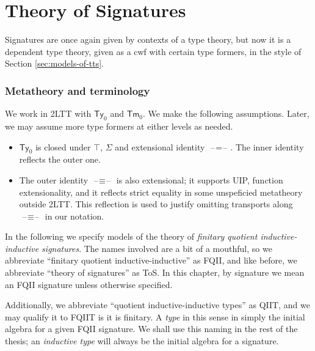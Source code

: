 \documentclass[12pt,a4paper,twoside,openany]{book}
\theoremstyle{remark}
\theoremstyle{definition}
\theoremstyle{theorem}
\newcommand{\Tm}{\mathsf{Tm}}
\newcommand{\Ty}{\mathsf{Ty}}
\newcommand{\blank}{\mathord{\hspace{1pt}\text{--}\hspace{1pt}}}
\begin{document}
\section{Theory of Signatures}
\label{sec:fqiit-tos}

Signatures are once again given by contexts of a type theory, but now it is a
dependent type theory, given as a cwf with certain type formers, in the style
of Section \ref{sec:models-of-tts}.

\subsubsection{Metatheory and terminology}
We work in 2LTT with $\Ty_0$ and $\Tm_0$. We
make the following assumptions. Later, we may assume more type formers at either
levels as needed.
\begin{itemize}
  \item $\Ty_0$ is closed under $\top$, $\Sigma$ and extensional identity $\blank\!=\!\blank$.
        The inner identity reflects the outer one.
  \item The outer identity $\blank\!\equiv\!\blank$ is also extensional; it supports
        UIP, function extensionality, and it reflects strict equality in some
        unspeficied metatheory outside 2LTT. This reflection is used to justify
        omitting transports along $\blank\!\equiv\!\blank$ in our notation.
\end{itemize}

In the following we specify models of the theory of \emph{finitary quotient
inductive-inductive signatures}. The names involved are a bit of a mouthful, so
we abbreviate ``finitary quotient inductive-inductive'' as FQII, and like
before, we abbreviate ``theory of signatures'' as ToS. In this chapter, by
signature we mean an FQII signature unless otherwise specified.

Additionally, we abbreviate ``quotient inductive-inductive types'' as QIIT, and
we may qualify it to FQIIT is it is finitary. A \emph{type} in this sense in
simply the initial algebra for a given FQII signature. We shall use this naming
in the rest of the thesis; an \emph{inductive type} will always be the initial
algebra for a signature.
\end{document}
